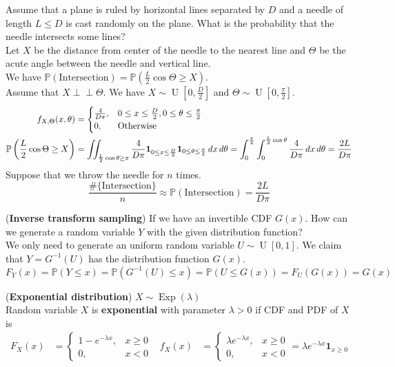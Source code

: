 \documentclass{huhtakm-template-book}
\newcommand{\independent}{\perp\!\!\!\perp}
\newcommand{\prob}{\mathbb{P}}
\DeclareMathOperator{\U}{U}
\DeclareMathOperator{\Exp}{Exp}
\begin{document}
\begin{eg}
	Assume that a plane is ruled by horizontal lines separated by $D$ and a needle of length $L\leq D$ is cast randomly on the plane. What is the probability that the needle intersects some lines?\\
	Let $X$ be the distance from center of the needle to the nearest line and $\Theta$ be the acute angle between the needle and vertical line.\\
	We have $\prob(\text{Intersection})=\prob\left(\frac{L}{2}\cos\Theta\geq X\right)$.\\
	Assume that $X\independent\Theta$. We have $X\sim\U\left[0,\frac{D}{2}\right]$ and $\Theta\sim\U\left[0,\frac{\pi}{2}\right]$.
	\begin{align*}
		f_{X,\Theta}(x,\theta)&=\begin{cases}
			\frac{4}{D\pi}, &0\leq x\leq\frac{D}{2},0\leq\theta\leq\frac{\pi}{2}\\
			0, &\text{Otherwise}
		\end{cases}\\
		\prob\left(\frac{L}{2}\cos\Theta\geq X\right)&=\iint_{\frac{L}{2}\cos\theta\geq x}\frac{4}{D\pi}\mathbf{1}_{0\leq x\leq\frac{D}{2}}\mathbf{1}_{0\leq\theta\leq\frac{\pi}{2}}\,dx\,d\theta=\intlu{0}{\frac{\pi}{2}}\intlu{0}{\frac{L}{2}\cos\theta}\frac{4}{D\pi}\,dx\,d\theta=\frac{2L}{D\pi}
	\end{align*}
	Suppose that we throw the needle for $n$ times.
	\begin{equation*}
		\frac{\#\{\text{Intersection}\}}{n}\approx\prob(\text{Intersection})=\frac{2L}{D\pi}
	\end{equation*}
\end{eg}
\begin{eg} (\textbf{Inverse transform sampling})
	If we have an invertible CDF $G(x)$. How can we generate a random variable $Y$ with the given distribution function?\\
	We only need to generate an uniform random variable $U\sim\U[0,1]$. We claim that $Y=G^{-1}(U)$ has the distribution function $G(x)$.
	\begin{equation*}
		F_{Y}(x)=\prob(Y\leq x)=\prob(G^{-1}(U)\leq x)=\prob(U\leq G(x))=F_{U}(G(x))=G(x)
	\end{equation*}
\end{eg}
\begin{eg}(\textbf{Exponential distribution}) $X\sim\Exp(\lambda)$\\
	Random variable $X$ is \textbf{exponential} with parameter $\lambda>0$ if CDF and PDF of $X$ is
	\begin{align*}
		F_{X}(x)&=\begin{cases}
			1-e^{-\lambda x}, &x\geq 0\\
			0, &x<0
		\end{cases} & f_{X}(x)&=\begin{cases}
			\lambda e^{-\lambda x}, &x\geq 0\\
			0, &x<0
		\end{cases}=\lambda e^{-\lambda x}\mathbf{1}_{x\geq 0}
	\end{align*}
\end{eg}
\end{document}
